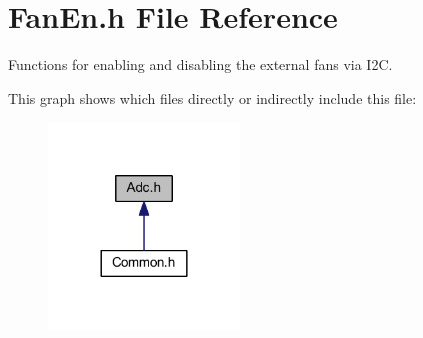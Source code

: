 \hypertarget{a00012}{\section{Fan\-En.\-h File Reference}
\label{a00012}
}


Functions for enabling and disabling the external fans via I2\-C.  


This graph shows which files directly or indirectly include this file\-:
\nopagebreak
\begin{figure}[H]
\begin{center}
\leavevmode
\includegraphics[width=144pt]{a00043}
\end{center}
\end{figure}
